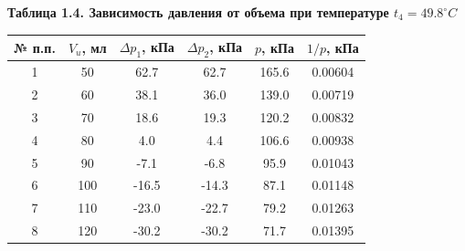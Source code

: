 \documentclass[12pt]{article}
\begin{document}
\begin{flushleft}
    \newpage
    \begin{center}
        \textbf{Таблица 1.4. Зависимость давления от объема при температуре $ t_4 = 49.8^\circ C $} \\
    \end{center}
    \begin{table}[h]
        \centering
        \begin{tabular}{|c|c|c|c|c|c|}
            \hline
            № п.п. & $ V_u $, мл & $ \Delta p_1 $, кПа & $ \Delta p_2 $, кПа & $ p $, кПа & $ 1/p $, кПа \\
            \hline
            1  & 50  & 62.7  & 62.7  & 165.6 & 0.00604 \\
            \hline
            2  & 60  & 38.1  & 36.0  & 139.0 & 0.00719 \\
            \hline
            3  & 70  & 18.6  & 19.3  & 120.2 & 0.00832 \\
            \hline
            4  & 80  & 4.0   & 4.4   & 106.6 & 0.00938 \\
            \hline
            5  & 90  & -7.1  & -6.8  & 95.9  & 0.01043 \\
            \hline
            6  & 100 & -16.5 & -14.3 & 87.1  & 0.01148 \\
            \hline
            7  & 110 & -23.0 & -22.7 & 79.2  & 0.01263 \\
            \hline
            8  & 120 & -30.2 & -30.2 & 71.7  & 0.01395 \\
            \hline
        \end{tabular}    
    \end{table}


\end{flushleft}
\end{document}

